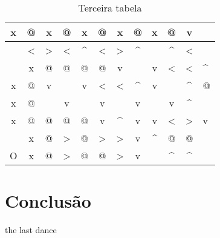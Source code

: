 \documentclass{article}
\begin{document}
\begin{table}[h]
	\centering
	\begin{tabular}{|c|c|c|c|c|c|c|c|c|c|c|}
		\hline
		x      & @ & x      & @      & x      & @ & x      & @      & x      & @      & v     \\ \hline
		\hat{} & < & >      & <      & ^      & < & >      & ^      & \hat{} & ^      & <     \\ \hline
		\hat{} & x & @      & @      & @      & @ & v      & \hat{} & v      & <      & < & ^ \\ \hline
		x      & @ & v      & \hat{} & v      & < & <      & ^      & v      & \hat{} & ^ & @ \\ \hline
		x      & @ & \hat{} & v      & \hat{} & v & \hat{} & v      & \hat{} & v      & ^     \\ \hline
		x      & @ & @      & @      & @      & v & ^      & v      & v      & <      & > & v \\ \hline
		\hat{} & x & @      & >      & @      & > & >      & v      & ^      & @      & @     \\ \hline
		O      & x & @      & >      & @      & @ & >      & v      & \hat{} & ^      & ^     \\ \hline
	\end{tabular}
	\caption{Terceira tabela}
\end{table}

\section{Conclusão}

the last dance
\end{document}
